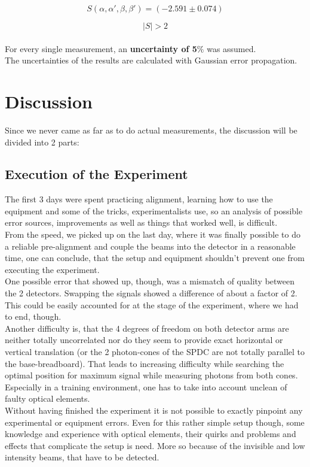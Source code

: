 \documentclass[12pt,a4paper]{article}
\begin{document}
\begin{multicols}{2}
$$S(\alpha, \alpha ', \beta , \beta ') = (-2.591 \pm 0.074)$$

$$|S| > 2$$\\

\noindent For every single measurement, an \textbf{uncertainty of 5$\%$} was assumed.\\
The uncertainties of the results are calculated with Gaussian error propagation.




\section{Discussion}
Since we never came as far as to do actual measurements, the discussion will be divided into 2 parts:

\subsection{Execution of the Experiment}
The first 3 days were spent practicing alignment, learning how to use the equipment and some of the tricks, experimentalists use, so an analysis of possible error sources, improvements as well as things that worked well, is difficult.\\
From the speed, we picked up on the last day, where it was finally possible to do a reliable pre-alignment and couple the beams into the detector in a reasonable time, one can conclude, that the setup and equipment shouldn't prevent one from executing the experiment.\\
One possible error that showed up, though, was a mismatch of quality between the 2 detectors. Swapping the signals showed a difference of about a factor of 2. This could be easily accounted for at the stage of the experiment, where we had to end, though.\\
Another difficulty is, that the 4 degrees of freedom on both detector arms are neither totally uncorrelated nor do they seem to provide exact horizontal or vertical translation (or the 2 photon-cones of the SPDC are not totally parallel to the base-breadboard). That leads to increasing difficulty while searching the optimal position for maximum signal while measuring photons from both cones.\\
Especially in a training environment, one has to take into account unclean of faulty optical elements.\\
Without having finished the experiment it is not possible to exactly pinpoint any experimental or equipment errors. Even for this rather simple setup though, some knowledge and experience with optical elements, their quirks and problems and effects that complicate the setup is need. More so because of the invisible and low intensity beams, that have to be detected.\\


\end{multicols}
\end{document}
